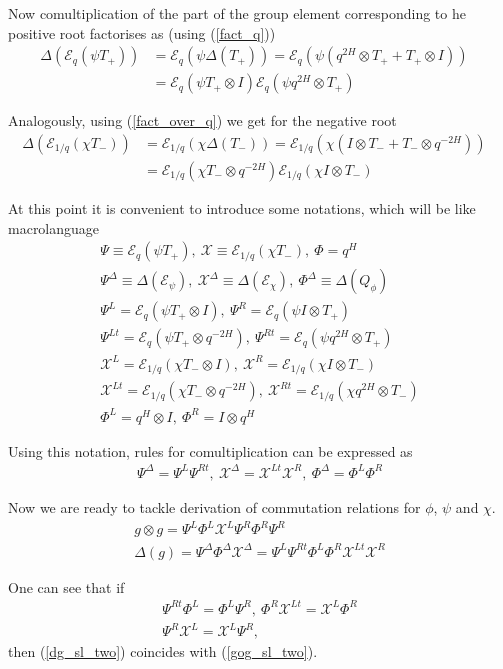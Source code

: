 \documentclass{article}
\newcommand{\lb}{\left (}
\newcommand{\rb}{\right )}
\newcommand{\be}{\begin{eqnarray}}
\newcommand{\ee}{\end{eqnarray}}
\newcommand {\?}{\textit{???}}
\newcommand{\me}[0]{\mathcal{E}}
\def\dg{\Delta (g)}
\def\gog{g \otimes g}
\def\Chi{\mathcal{X}}
\newcommand{\EChiL}[0]{\Chi^L}
\newcommand{\EChiR}[0]{\Chi^R}
\newcommand{\EChiLT}[0]{\Chi^{Lt}}
\newcommand{\EChiRT}[0]{\Chi^{Rt}}
\newcommand{\EChiD}[0]{\Chi^\Delta}
\newcommand{\EPsiL}[0]{\Psi^L}
\newcommand{\EPsiR}[0]{\Psi^R}
\newcommand{\EPsiLT}[0]{\Psi^{Lt}}
\newcommand{\EPsiRT}[0]{\Psi^{Rt}}
\newcommand{\EPsiD}[0]{\Psi^\Delta}
\newcommand{\QPhiL}[0]{\Phi^L}
\newcommand{\QPhiR}[0]{\Phi^R}
\newcommand{\QPhiD}[0]{\Phi^\Delta}
\newcommand{\comul}[1]{\Delta \lb #1 \rb}
\begin{document}
Now comultiplication of the part of the group element corresponding to he positive root factorises as (using (\ref{fact_q}))
\be
\comul{\me_q \lb \psi T_+ \rb} & = \me_q \lb \psi \comul{T_+}\rb = \me_q \lb \psi \lb q^{2H} \otimes T_+ + T_+ \otimes I \rb \rb & \\
& = \me_q \lb \psi T_+ \otimes I\rb \me_q \lb \psi q^{2H} \otimes T_+\rb
\ee

Analogously, using (\ref{fact_over_q}) we get for the negative root
\be
\comul{\me_{1/q} \lb \chi T_- \rb} & = \me_{1/q} \lb \chi \comul{T_-}\rb = \me_{1/q} \lb \chi \lb I \otimes T_- + T_- \otimes q^{-2H} \rb \rb & \\
& = \me_{1/q} \lb \chi T_- \otimes q^{-2H}\rb \me_{1/q} \lb \chi I \otimes T_-\rb
\ee

At this point it is convenient to introduce some notations, which will be like macrolanguage
\be
\Psi \equiv \me_q \lb \psi T_+ \rb,\ \Chi \equiv \me_{1/q} \lb \chi T_- \rb,\ \Phi = q^H \\
\EPsiD \equiv \comul{\me_\psi},\ \EChiD \equiv \comul{\me_\chi},\ \QPhiD \equiv \comul{Q_\phi} \\
\EPsiL = \me_q \lb \psi T_+ \otimes I\rb,\ \EPsiR = \me_q \lb \psi I \otimes T_+ \rb \\
\EPsiLT = \me_q \lb \psi T_+ \otimes q^{-2H}\rb,\ \EPsiRT = \me_q \lb \psi q^{2H} \otimes T_+ \rb \\
\EChiL = \me_{1/q} \lb \chi T_- \otimes I\rb,\ \EChiR = \me_{1/q} \lb \chi I \otimes T_- \rb \\
\EChiLT = \me_{1/q} \lb \chi T_- \otimes q^{-2H}\rb,\ \EChiRT = \me_{1/q} \lb \chi q^{2H} \otimes T_- \rb \\
\QPhiL = q^H \otimes I,\ \QPhiR = I \otimes q^H
\ee

Using this notation, rules for comultiplication can be expressed as
\be
\EPsiD = \EPsiL \EPsiRT,\ \EChiD = \EChiLT \EChiR,\ \QPhiD = \QPhiL \QPhiR
\ee

Now we are ready to tackle derivation of commutation relations for $\phi$, $\psi$ and $\chi$.
\be
\gog = \EPsiL \QPhiL \EChiL \EPsiR \QPhiR \EPsiR \label{gog_sl_two} \\ 
\dg = \EPsiD \QPhiD \EChiD = \EPsiL \EPsiRT \QPhiL \QPhiR \EChiLT \EChiR \label{dg_sl_two}
\ee

One can see that if
\be
\EPsiRT \QPhiL = \QPhiL \EPsiR,\ \QPhiR \EChiLT = \EChiL \QPhiR \label{sl_two_first_pass} \\
\EPsiR \EChiL = \EChiL \EPsiR \label{sl_two_second_pass}
,
\ee
then (\ref{dg_sl_two}) coincides with (\ref{gog_sl_two}).
\end{document}
